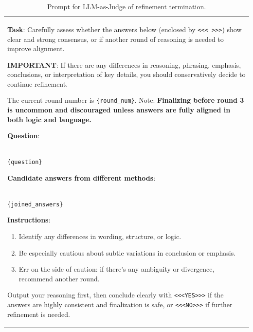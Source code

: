 \begin{table}[h!]
  \caption{Prompt for LLM-as-Judge of refinement termination.}
  \label{tab:consensus-assessment-prompt}
  \centering
  \small %
  \renewcommand{\arraystretch}{1.25} %
  
  \begin{tabularx}{\linewidth}{X} %
    \toprule
    \textbf{Task}: Carefully assess whether the answers below (enclosed by \texttt{<<< >>>}) show clear and strong consensus, or if another round of reasoning is needed to improve alignment.
    \vspace{0.5em}

    {\color{AnswerRed}\textbf{IMPORTANT}: If there are any differences in reasoning, phrasing, emphasis, conclusions, or interpretation of key details, you should conservatively decide to continue refinement.}
    \vspace{0.5em}

    The current round number is \texttt{\{round\_num\}}. Note: {\color{AnswerRed}\textbf{Finalizing before round 3 is uncommon and discouraged unless answers are fully aligned in both logic and language.}}
    \vspace{1em}

    \textbf{Question}: \\
    \texttt{\{question\}}
    \vspace{1em}

    \textbf{Candidate answers from different methods}: \\
    \texttt{\{joined\_answers\}}
    \vspace{0.5em}

    \textbf{Instructions}:
    \begin{enumerate}[leftmargin=*, topsep=0.5em, itemsep=0.2em]
        \item Identify any differences in wording, structure, or logic.
        \item Be especially cautious about subtle variations in conclusion or emphasis.
        \item Err on the side of caution: if there's any ambiguity or divergence, recommend another round.
    \end{enumerate}
    \vspace{0.5em}
    
    Output your reasoning first, then conclude clearly with {\color{SearchCyan}\texttt{<<<YES>>>}} if the answers are highly consistent and finalization is safe, or {\color{AnswerRed}\texttt{<<<NO>>>}} if further refinement is needed. \\
    \bottomrule
  \end{tabularx}
\end{table}

